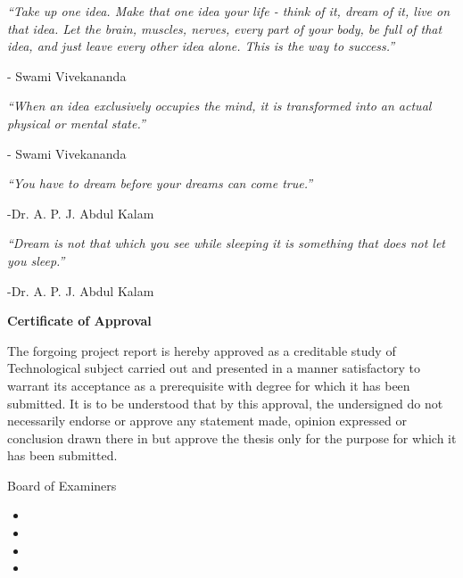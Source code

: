 \documentclass[11pt, a4paper]{report}
\begin{document}
{\it ``Take up one idea. Make that one idea your life - think of it, dream of it, live on that idea. Let the brain, muscles, nerves, every part of your body, be full of that idea, and just leave every other idea alone. This is the way to success.''\\}

\begin{flushright}
- Swami Vivekananda
\end{flushright}

{\it ``When an idea exclusively occupies the mind, it is transformed into an actual physical or mental state.''}
\begin{flushright}
- Swami Vivekananda
\end{flushright}

{\it ``You have to dream before your dreams can come true.''}
\begin{flushright}
-Dr. A. P. J. Abdul Kalam
\end{flushright}


{\it ``Dream is not that which you see while sleeping it is something that does not let you sleep.''}
\begin{flushright}
-Dr. A. P. J. Abdul Kalam
\end{flushright}

\newpage


 \begin{center}
        \vspace*{1cm}
         \LARGE
        \textbf{Certificate of Approval}
        
        \vspace{1.5cm}
 \justify      
		The forgoing project report is hereby approved as a creditable study of Technological subject carried out and presented in a manner satisfactory to warrant its acceptance as a prerequisite with degree for which it has been submitted. It is to be understood that by this approval, the undersigned do not necessarily endorse or approve any statement made, opinion expressed or conclusion drawn there in but approve the thesis only for the purpose for which it has been submitted.        
        
        \vspace{1.5cm}
        
        Board of Examiners
        
        \begin{itemize}
        \item 
        \item
        \item
        \item
        \end{itemize}
        
        \vfill
        
       
        
        
        
    \end{center}
\end{document}
